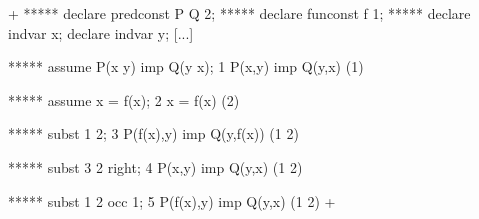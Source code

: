 \gfexample+
   ***** declare predconst P Q 2;
   ***** declare funconst f 1; 
   ***** declare indvar x; declare indvar y;
   [...]

   ***** assume P(x y) imp Q(y x);
   1   P(x,y) imp Q(y,x)     (1)

   ***** assume x = f(x);
   2   x = f(x)     (2)

   ***** subst 1 2;
   3   P(f(x),y) imp Q(y,f(x))     (1 2)

   ***** subst 3 2 right;
   4   P(x,y) imp Q(y,x)     (1 2)

   ***** subst 1 2 occ 1;
   5   P(f(x),y) imp Q(y,x)     (1 2)
+


